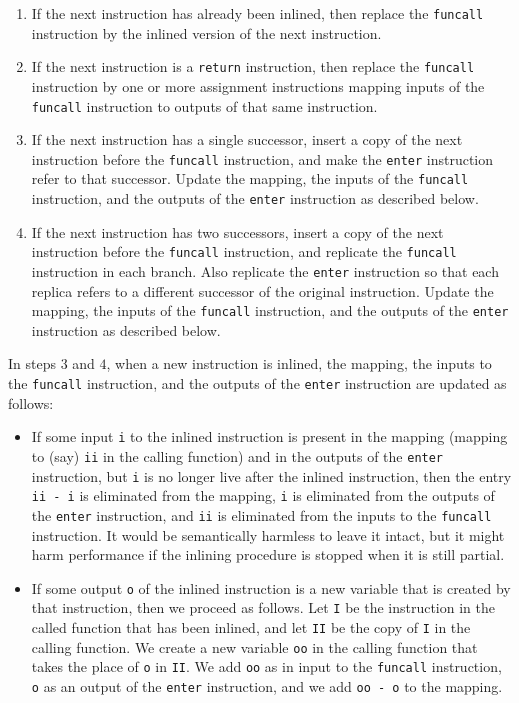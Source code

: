 \begin{enumerate}
\item If the next instruction has already been inlined, then replace
  the \texttt{funcall} instruction by the inlined version of the next
  instruction.
\item If the next instruction is a \texttt{return} instruction, then
  replace the \texttt{funcall} instruction by one or more assignment
  instructions mapping inputs of the \texttt{funcall} instruction to
  outputs of that same instruction.
\item If the next instruction has a single successor, insert a copy of
  the next instruction before the \texttt{funcall} instruction, and
  make the \texttt{enter} instruction refer to that successor.  Update
  the mapping, the inputs of the \texttt{funcall} instruction, and the
  outputs of the \texttt{enter} instruction as described below.
\item If the next instruction has two successors, insert a copy of the
  next instruction before the \texttt{funcall} instruction, and
  replicate the \texttt{funcall} instruction in each branch.  Also
  replicate the \texttt{enter} instruction so that each replica refers
  to a different successor of the original instruction.  Update the
  mapping, the inputs of the \texttt{funcall} instruction, and the
  outputs of the \texttt{enter} instruction as described below.
\end{enumerate}

In steps $3$ and $4$, when a new instruction is inlined, the mapping,
the inputs to the \texttt{funcall} instruction, and the outputs of the
\texttt{enter} instruction are updated as follows:

\begin{itemize}
\item If some input \texttt{i} to the inlined instruction is present
  in the mapping (mapping to (say) \texttt{ii} in the calling
  function) and in the outputs of the \texttt{enter} instruction, but
  \texttt{i} is no longer live after the inlined instruction, then the
  entry \texttt{ii - i} is eliminated from the mapping, \texttt{i} is
  eliminated from the outputs of the \texttt{enter} instruction, and
  \texttt{ii} is eliminated from the inputs to the \texttt{funcall}
  instruction.  It would be semantically harmless to leave it intact,
  but it might harm performance if the inlining procedure is stopped
  when it is still partial.
\item If some output \texttt{o} of the inlined instruction is a new
  variable that is created by that instruction, then we proceed as
  follows.  Let \texttt{I} be the instruction in the called function
  that has been inlined, and let \texttt{II} be the copy of \texttt{I}
  in the calling function.  We create a new variable \texttt{oo} in
  the calling function that takes the place of \texttt{o} in
  \texttt{II}.  We add \texttt{oo} as in input to the \texttt{funcall}
  instruction, \texttt{o} as an output of the \texttt{enter}
  instruction, and we add \texttt{oo - o} to the mapping.
\end{itemize}

